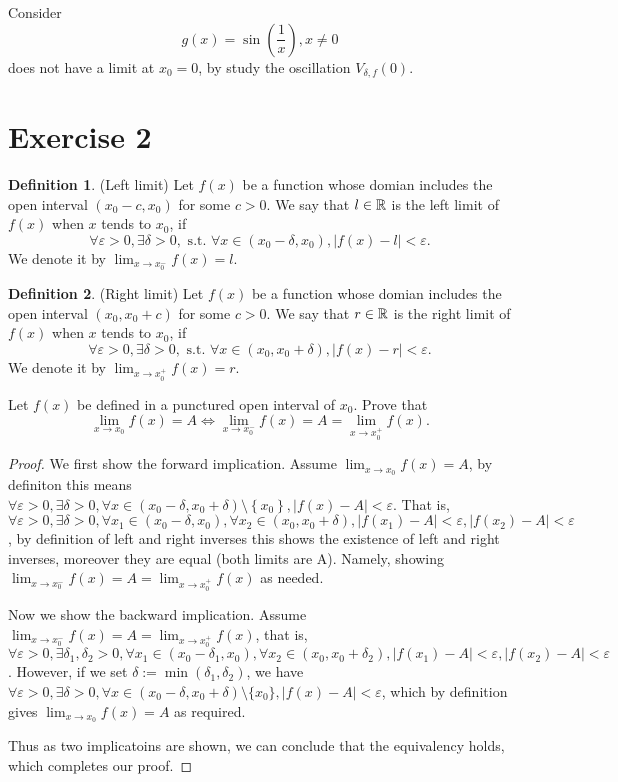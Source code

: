 \documentclass{homework}
\newcommand{\R}{\bb{R}} %
\newcommand{\ra}{\rightarrow}
\newcommand{\?}{\stackrel{?}{=}}
\newcommand{\ep}{\varepsilon}
\theoremstyle{definition}
\newtheorem*{definition}{Definition}
\begin{document}
\question[4] Consider \[g(x)=\sin(\frac1x),x\neq0\] does not have a limit at \(x_0=0\), by study the oscillation \(V_{\delta,f}(0).\)



\newpage
\section*{Exercise 2}
\begin{definition}
    (Left limit) Let $f(x)$ be a function whose domian includes the open interval $(x_0-c, x_0)$ for some $c>0$. We say that $l\in\R$ is the left limit of $f(x)$ when $x$ tends to $x_0$, if \[\forall\ep>0,\exists\delta>0, \text{ s.t. } \forall x\in (x_0-\delta, x_0), |f(x)-l|<\ep.\] We denote it by $\lim_{x\ra x_0^-}f(x)=l.$
\end{definition}

\begin{definition}
    (Right limit) Let $f(x)$ be a function whose domian includes the open interval $(x_0, x_0+c)$ for some $c>0$. We say that $r\in\R$ is the right limit of $f(x)$ when $x$ tends to $x_0$, if \[\forall\ep>0,\exists\delta>0, \text{ s.t. } \forall x\in (x_0, x_0+\delta), |f(x)-r|<\ep.\] We denote it by $\lim_{x\ra x_0^+}f(x)=r.$
\end{definition}

\question[1] Let $f(x)$ be defined in a punctured open interval of $x_0$. Prove that \[\lim_{x\ra x_0}f(x)=A\iff \lim_{x\ra x_0^-}f(x)=A=\lim_{x\ra x_0^+}f(x).\]

\begin{proof}
    We first show the forward implication. Assume \(\lim_{x\ra x_0}f(x)=A\), by definiton this means \(\forall\ep>0, \exists \delta>0, \forall x\in (x_0-\delta, x_0+\delta)\setminus\left\{ x_0 \right\}, |f(x)-A|<\ep\). That is, \(\forall\ep>0, \exists \delta>0, \forall x_1\in (x_0-\delta, x_0), \forall x_2\in (x_0, x_0+\delta), |f(x_1)-A|<\ep, |f(x_2)-A|<\ep\), by definition of left and right inverses this shows the existence of left and right inverses, moreover they are equal (both limits are A). Namely, showing \(\lim_{x\ra x_0^-}f(x)=A=\lim_{x\ra x_0^+}f(x)\) as needed.

    Now we show the backward implication. Assume \(\lim_{x\ra x_0^-}f(x)=A=\lim_{x\ra x_0^+}f(x)\), that is, \(\forall\ep>0, \exists \delta_1, \delta_2>0, \forall x_1\in (x_0-\delta_1, x_0), \forall x_2\in (x_0, x_0+\delta_2), |f(x_1)-A|<\ep, |f(x_2)-A|<\ep\). However, if we set \(\delta:=\min(\delta_1,\delta_2)\), we have \(\forall\ep>0, \exists \delta>0, \forall x\in (x_0-\delta, x_0+\delta)\setminus\{x_0\}, |f(x)-A|<\ep\), which by definition gives \(\lim_{x\ra x_0}f(x)=A\) as required.

    Thus as two implicatoins are shown, we can conclude that the equivalency holds, which completes our proof. 
\end{proof}
\end{document}
